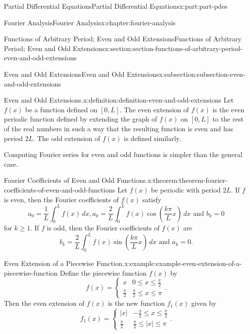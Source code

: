 \documentclass[twoside,10pt,]{book}
\numberwithin{equation}{part}
\newcommand{\amp}{&}
\begin{document}
\begin{partptx}{Partial Differential Equations}{}{Partial Differential Equations}{}{}{x:part:part-pdes}
\begin{chapterptx}{Fourier Analysis}{}{Fourier Analysis}{}{}{x:chapter:fourier-analysis}
\begin{sectionptx}{Functions of Arbitrary Period; Even and Odd Extensions}{}{Functions of Arbitrary Period; Even and Odd Extensions}{}{}{x:section:section-functions-of-arbitrary-period-even-and-odd-extensions}
\begin{subsectionptx}{Even and Odd Extensions}{}{Even and Odd Extensions}{}{}{x:subsection:subsection-even-and-odd-extensions}
\begin{definition}{Even and Odd Extensions.}{x:definition:definition-even-and-odd-extensions}
%
Let \(f(x)\) be a function defined on \([0,L]\). The even extension of \(f(x)\) is the even periodic function defined by extending the graph of \(f(x)\) on \([0,L]\) to the rest of the real numbers in such a way that the resulting function is even and has period \(2L\). The odd extension of \(f(x)\) is defined similarly.%
\end{definition}
Computing Fourier series for even and odd functions is simpler than the general case.%
\begin{theorem}{Fourier Coefficients of Even and Odd Functions.}{}{x:theorem:theorem-fourier-coefficients-of-even-and-odd-functions}%
%
Let \(f(x)\) be periodic with period \(2L\). If \(f\) is even, then the Fourier coefficients of \(f(x)\) satisfy%
\begin{equation*}
a_{0} = \frac{1}{L}\int_{0}^{L}f(x)\,dx, a_{k} = \frac{2}{L}\int_{0}^{L}f(x)\cos\left(\frac{k\pi}{L}x\right)\,dx\text{ and } b_{k} = 0
\end{equation*}
for \(k\geq1\). If \(f\) is odd, then the Fourier coefficients of \(f(x)\) are%
\begin{equation*}
b_{k} = \frac{2}{L}\int_{0}^{L}f(x)\sin\left(\frac{k\pi}{L}x\right)\,dx\text{ and } a_{k} = 0.
\end{equation*}
%
\end{theorem}
\begin{example}{Even Extension of a Piecewise Function.}{x:example:example-even-extension-of-a-piecewise-function}%
Define the piecewise function \(f(x)\) by%
\begin{equation*}
f(x) = \begin{cases}x \amp 0\leq x\leq \frac{\pi}{2} \\ \frac{\pi}{2} \amp \frac{\pi}{2}\leq x\leq \pi\end{cases}.
\end{equation*}
Then the even extension of \(f(x)\) is the new function \(f_{1}(x)\) given by%
\begin{equation*}
f_{1}(x) = \begin{cases}|x| \amp -\frac{\pi}{2}\leq x\leq \frac{\pi}{2} \\ \frac{\pi}{2} \amp \frac{\pi}{2}\leq |x|\leq \pi\end{cases}.
\end{equation*}

\end{example}
\end{subsectionptx}
\end{sectionptx}
\end{chapterptx}
\end{partptx}
\end{document}
